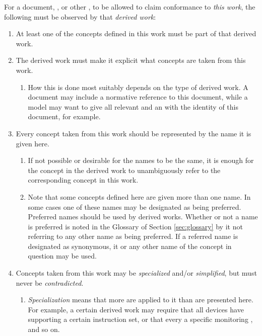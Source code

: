 %
%

For a document, , or other , to be allowed to claim conformance to \textit{this work}, the following must be observed by that \textit{derived work}:

\begin{enumerate}
\item At least one of the concepts defined in this work must be part of that derived work.
\item The derived work must make it explicit what concepts are taken from this work.
	\begin{enumerate}
	\item How this is done most suitably depends on the type of derived work. A document may include a normative reference to this document, while a model may want to give all relevant  and  an  with the identity of this document, for example.
	\end{enumerate}
\item Every concept taken from this work should be represented by the name it is given here.
	\begin{enumerate}
	\item If not possible or desirable for the names to be the same, it is enough for the concept in the derived work to unambiguously refer to the corresponding concept in this work.
	\item Note that some concepts defined here are given more than one name. In some cases one of these names may be designated as being preferred. Preferred names should be used by derived works. Whether or not a name is preferred is noted in the Glossary of Section \ref{sec:glossary} by it not referring to any other name as being preferred. If a referred name is designated as synonymous, it or any other name of the concept in question may be used.
	\end{enumerate}
\item Concepts taken from this work may be \textit{specialized} and/or \textit{simplified}, but must never be \textit{contradicted}.
	\begin{enumerate}
	\item \textit{Specialization} means that more  are applied to it than are presented here. For example, a certain derived work may require that all devices have  supporting a certain instruction set, or that every   a specific monitoring , and so on.

\end{enumerate}
\end{enumerate}
